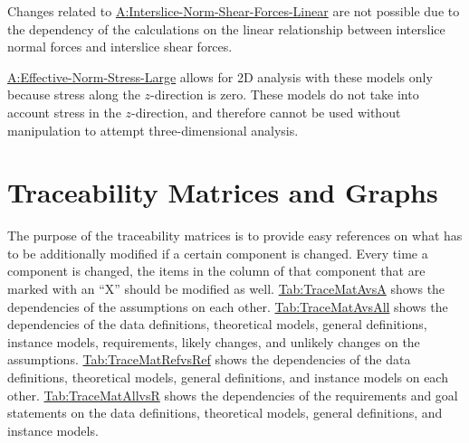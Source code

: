 \documentclass[12pt]{article}
\begin{document}
\begin{description}[font=\normalfont]
\item[Normal-And-Shear-Linear-Only:\phantomsection\label{UC_normshearlinear}]{Changes related to \hyperref[assumpINSFL]{A:Interslice-Norm-Shear-Forces-Linear} are not possible due to the dependency of the calculations on the linear relationship between interslice normal forces and interslice shear forces.}
\item[2D-Analysis-Only:\phantomsection\label{UC_2donly}]{\hyperref[assumpENSL]{A:Effective-Norm-Stress-Large} allows for 2D analysis with these models only because stress along the $z$-direction is zero. These models do not take into account stress in the $z$-direction, and therefore cannot be used without manipulation to attempt three-dimensional analysis.}
\end{description}
\section{Traceability Matrices and Graphs}
\label{Sec:TraceMatrices}
The purpose of the traceability matrices is to provide easy references on what has to be additionally modified if a certain component is changed. Every time a component is changed, the items in the column of that component that are marked with an ``X'' should be modified as well. \hyperref[Table:TraceMatAvsA]{Tab:TraceMatAvsA} shows the dependencies of the assumptions on each other. \hyperref[Table:TraceMatAvsAll]{Tab:TraceMatAvsAll} shows the dependencies of the data definitions, theoretical models, general definitions, instance models, requirements, likely changes, and unlikely changes on the assumptions. \hyperref[Table:TraceMatRefvsRef]{Tab:TraceMatRefvsRef} shows the dependencies of the data definitions, theoretical models, general definitions, and instance models on each other. \hyperref[Table:TraceMatAllvsR]{Tab:TraceMatAllvsR} shows the dependencies of the requirements and goal statements on the data definitions, theoretical models, general definitions, and instance models.
\end{document}
